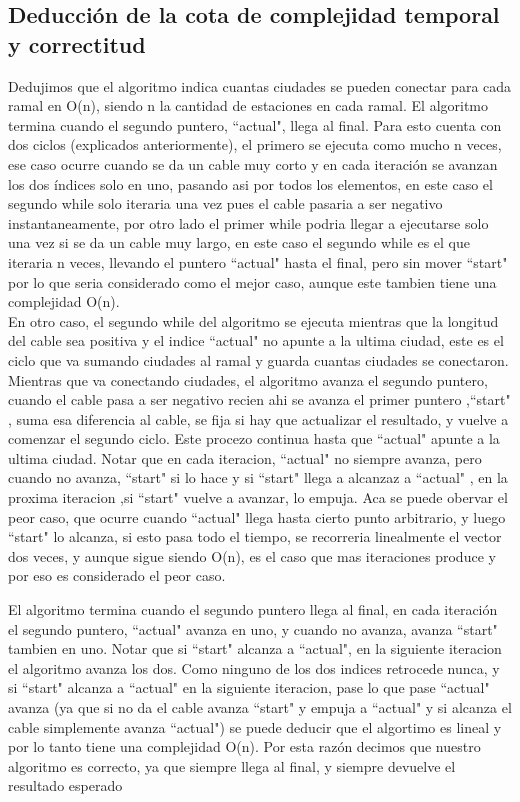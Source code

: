 \subsection{Deducción de la cota de complejidad temporal y correctitud}

Dedujimos que el algoritmo indica cuantas ciudades se pueden conectar para cada ramal en O(n), siendo n la cantidad de estaciones en cada ramal. El algoritmo termina cuando el segundo puntero, ``actual"$ $, llega al final. Para esto cuenta con dos ciclos (explicados anteriormente), el primero se ejecuta como mucho n veces, ese  caso ocurre cuando se da un cable muy corto y en cada iteración se avanzan los dos índices solo en uno, pasando asi por todos los elementos, en este caso el segundo while solo iteraria una vez pues el cable pasaria a ser negativo instantaneamente, por otro lado el primer while podria llegar a ejecutarse solo una vez si se da un cable muy largo, en este caso el segundo while es el que iteraria n veces, llevando el puntero ``actual"$ $ hasta el final, pero sin mover ``start"$ $ por lo que seria considerado como el mejor caso, aunque este tambien tiene una complejidad O(n).\\
En otro caso, el segundo while del algoritmo se ejecuta mientras que la longitud del cable sea positiva y el indice ``actual"$ $ no apunte a la ultima ciudad, este es el ciclo que va sumando ciudades al ramal y guarda cuantas ciudades se conectaron. Mientras que va conectando ciudades, el algoritmo avanza el segundo puntero, cuando el cable pasa a ser negativo recien ahi se avanza el primer puntero  ,``start"$ $,  suma esa diferencia al cable, se fija si hay que actualizar el resultado, y vuelve a comenzar el segundo ciclo. Este procezo continua hasta que ``actual"$ $ apunte a la ultima ciudad. Notar que en cada iteracion, ``actual"$ $ no siempre avanza, pero cuando no avanza, ``start"$ $ si lo hace y si ``start"$ $ llega a alcanzaz a ``actual"$ $ , en la proxima iteracion ,si ``start"$ $ vuelve a avanzar, lo empuja. Aca se puede obervar el peor caso, que ocurre cuando ``actual"$ $ llega hasta cierto punto arbitrario, y luego ``start"$ $ lo alcanza, si esto pasa todo el tiempo, se recorreria linealmente el vector dos veces, y aunque sigue siendo O(n), es el caso que mas iteraciones produce y por eso es considerado el peor caso.

El algoritmo termina cuando el segundo puntero llega al final, en cada iteración el segundo puntero, ``actual"$ $ avanza en uno, y cuando no avanza, avanza ``start"$ $  tambien en uno. Notar que si ``start"$ $ alcanza a ``actual"$ $, en la siguiente iteracion el algoritmo avanza los dos. Como ninguno de los dos indices retrocede nunca, y si ``start"$ $ alcanza a ``actual"$ $ en la siguiente iteracion, pase lo que pase ``actual"$ $ avanza (ya que si no da el cable avanza ``start"$ $ y empuja a ``actual"$ $ y si alcanza el cable simplemente avanza ``actual"$ $) se puede deducir que el algortimo es lineal y por lo tanto tiene una complejidad O(n). Por esta razón decimos que nuestro algoritmo es correcto, ya que siempre llega al final, y siempre devuelve el resultado esperado


